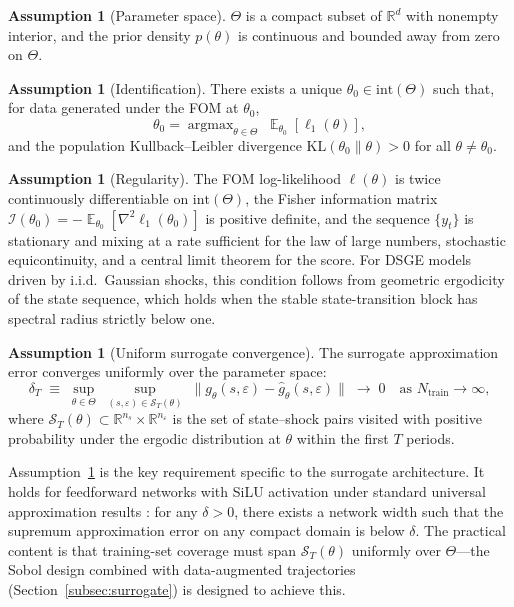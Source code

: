 \documentclass[12pt]{article}
\theoremstyle{plain}
\theoremstyle{definition}
\newtheorem{assumption}[theorem]{Assumption}
\theoremstyle{remark}
\DeclareMathOperator{\E}{\mathbb{E}}
\DeclareMathOperator{\argmax}{argmax}
\newcommand{\R}{\mathbb{R}}
\newcommand{\eps}{\varepsilon}
\begin{document}
\begin{assumption}[Parameter space]
\label{ass:compact}
$\Theta$ is a compact subset of $\R^d$ with nonempty interior, and the prior density $p(\theta)$ is continuous and bounded away from zero on $\Theta$.
\end{assumption}

\begin{assumption}[Identification]
\label{ass:identification}
There exists a unique $\theta_0 \in \text{int}(\Theta)$ such that, for data generated under the FOM at $\theta_0$,
\[
\theta_0 = \argmax_{\theta \in \Theta}\;
  \E_{\theta_0}\!\left[\ell_1(\theta)\right],
\]
and the population Kullback--Leibler divergence $\text{KL}(\theta_0 \| \theta) > 0$ for all $\theta \neq \theta_0$.
\end{assumption}

\begin{assumption}[Regularity]
\label{ass:regularity}
The FOM log-likelihood $\ell(\theta)$ is twice continuously differentiable on $\text{int}(\Theta)$, the Fisher information matrix $\mathcal{I}(\theta_0) = -\E_{\theta_0}[\nabla^2 \ell_1(\theta_0)]$ is positive definite, and the sequence $\{y_t\}$ is stationary and mixing at a rate sufficient for the law of large numbers, stochastic equicontinuity, and a central limit theorem for the score. For DSGE models driven by i.i.d.\ Gaussian shocks, this condition follows from geometric ergodicity of the state sequence, which holds when the stable state-transition block has spectral radius strictly below one.
\end{assumption}

\begin{assumption}[Uniform surrogate convergence]
\label{ass:surrogate_convergence}
The surrogate approximation error converges uniformly over the parameter space:
\[
\delta_T \;\equiv\; \sup_{\theta \in \Theta}\;
  \sup_{(s,\eps) \in \mathcal{S}_T(\theta)}\;
  \|g_\theta(s, \eps) - \hat{g}_\theta(s, \eps)\| \;\to\; 0
  \quad \text{as } N_{\text{train}} \to \infty,
\]
where $\mathcal{S}_T(\theta) \subset \R^{n_s} \times \R^{n_\eps}$ is the set of state--shock pairs visited with positive probability under the ergodic distribution at $\theta$ within the first $T$ periods.
\end{assumption}

Assumption~\ref{ass:surrogate_convergence} is the key requirement specific to the surrogate architecture. It holds for feedforward networks with SiLU activation under standard universal approximation results \citep{hornik1989multilayer,cybenko1989approximation}: for any $\delta > 0$, there exists a network width such that the supremum approximation error on any compact domain is below $\delta$. The practical content is that training-set coverage must span $\mathcal{S}_T(\theta)$ uniformly over $\Theta$---the Sobol design combined with data-augmented trajectories (Section~\ref{subsec:surrogate}) is designed to achieve this.
\end{document}
